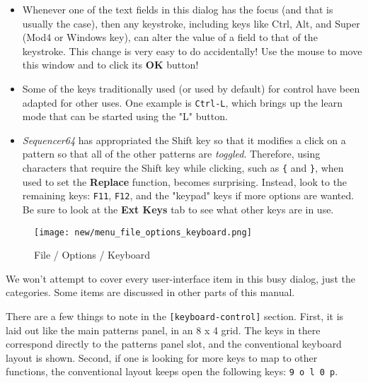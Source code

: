    \begin{itemize}
      \item Whenever one of the text fields in this dialog has the focus (and
         that is usually the case), then any keystroke, including keys like
         Ctrl, Alt, and Super (Mod4 or Windows key), can alter the value of a
         field to that of the keystroke.  This change is very easy to do
         accidentally!  \textsf{Use the mouse} to move this window and to click
         its \textbf{OK} button!
      \item Some of the keys traditionally used (or used by default) for
         control have been adapted for other uses.  One example is
         \texttt{Ctrl-L}, which brings up the learn mode that can be started
         using the "L" button.
      \item \textsl{Sequencer64} has appropriated the
          Shift key so that it
         modifies a click on a pattern so that all of the other patterns are
         \textsl{toggled}.  Therefore, using characters that require the Shift
         key while clicking, such as \texttt{\{} and \texttt{\}}, when used
         to set the \textbf{Replace} function, becomes surprising.
         Instead, look to the remaining keys: \texttt{F11}, \texttt{F12},
         and the "keypad" keys if more options are wanted.  Be sure to
         look at the \textbf{Ext Keys} tab to see what other keys are in use.
   \end{itemize}

\begin{figure}[H]
   \centering 
%
%
   \texttt{[image: new/menu\_file\_options\_keyboard.png]}
   \caption{File / Options / Keyboard}
   \label{fig:seq64_menu_file_options_keyboard}
\end{figure}

   We won't attempt to cover every user-interface item in this busy
   dialog, just the categories.  Some items are discussed in other parts of
   this manual.

   There are a few things to note in the \texttt{[keyboard-control]} section.
   First, it is laid out like the main patterns panel, in an 8 x 4 grid.
   The keys in there correspond directly to the patterns panel slot, and the
   conventional keyboard layout is shown.
   Second, if one is looking for more keys to map to other functions, the
   conventional layout keeps open the following keys:
   \texttt{9 o l 0 p}.


